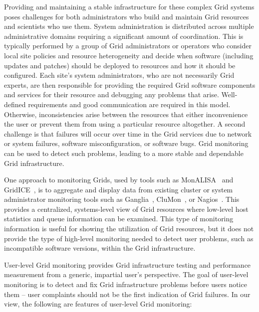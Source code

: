 \documentclass[times,10pt,twocolumn]{article}
\begin{document}
Providing and maintaining a stable infrastructure for these complex 
Grid systems poses challenges for both administrators who build and
maintain Grid resources and scientists who use them.  System
administration is distributed across multiple administrative domains 
requiring a significant amount of coordination.  This is typically performed by
a group of Grid administrators or operators who consider local site policies and
resource heterogeneity
and decide when software (including updates and patches) should be deployed to
resources and how it should be configured.  
Each site's system administrators, who are not necessarily Grid
experts, are then responsible for providing the required Grid software
components and services for their resource and debugging any problems that
arise.  Well-defined requirements and good communication are required in this
model.  Otherwise, inconsistencies arise between the resources that either
inconvenience the user or prevent them from using a particular resource
altogether.  A second challenge is that failures will occur over
time in the Grid services due to network or system failures, software
misconfiguration, or software bugs. 
Grid monitoring can be used to detect such problems, leading to a more
stable and dependable Grid infrastructure.

One approach to monitoring Grids, used by tools such as
MonALISA~\cite{monalisa} and GridICE~\cite{gridice}, is to aggregate and
display data from existing cluster or system administrator monitoring tools
such as Ganglia~\cite{ganglia}, CluMon~\cite{clumon}, or
Nagios~\cite{nagios}.  This provides a centralized, systems-level view of Grid
resources where low-level host statistics and queue information can be
examined.  This type of monitoring information is useful for showing the
utilization of Grid resources, but it does not provide the type of
high-level monitoring needed to detect user problems, such as incompatible
software versions, within the Grid infrastructure.

User-level Grid monitoring provides Grid infrastructure testing and performance measurement 
from a generic, impartial user's perspective.  The goal of user-level monitoring is 
to detect and fix Grid infrastructure problems before users notice them -- 
user complaints should not be the first indication of Grid failures.  
In our view, the following are features of user-level Grid monitoring:
\end{document}
